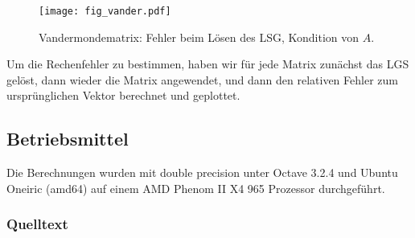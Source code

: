 \documentclass{scrartcl}
\begin{document}
\begin{figure}[!htb]
\centering
\texttt{[image: fig\_vander.pdf]}
\caption{Vandermondematrix: Fehler beim Lösen des LSG, Kondition von \(A\). }
\label{fig:svd}
\end{figure}

Um die Rechenfehler zu bestimmen, haben wir für jede Matrix zunächst das LGS
gelöst, dann wieder die Matrix angewendet, und dann den relativen Fehler zum
ursprünglichen Vektor berechnet und geplottet.

\subsection{Betriebsmittel}

Die Berechnungen wurden mit double precision unter Octave 3.2.4 und Ubuntu
Oneiric (amd64) auf einem AMD Phenom II X4 965 Prozessor durchgeführt.

\subsubsection{Quelltext}











\end{document}
